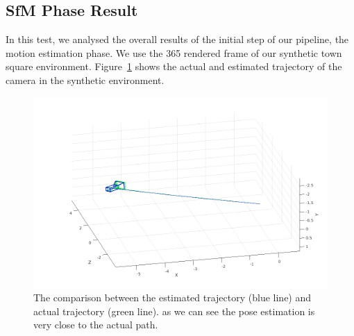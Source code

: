 \subsection{SfM Phase Result}
In this test, we analysed the overall results of the initial step of our
pipeline, the motion estimation phase. We use the 365 rendered frame of our
synthetic town square environment. Figure~\ref{fig:trajectory} shows the actual
and estimated trajectory of the camera in the synthetic environment.
%
\begin{figure}[h]
\centering
\includegraphics[width=\linewidth]{img/trajectory.png}
\caption{The comparison between the estimated trajectory (blue line) and
actual trajectory (green line). as we can see the pose estimation is very close
to the actual path.}
\label{fig:trajectory}
\end{figure}
%
